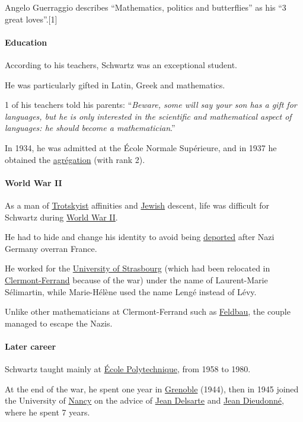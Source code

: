 \documentclass{article}
\begin{document}
%
Angelo Guerraggio describes ``Mathematics, politics and butterflies'' as his ``3 great loves''.[1]

\paragraph{Education}
According to his teachers, Schwartz was an exceptional student.

He was particularly gifted in Latin, Greek and mathematics.

1 of his teachers told his parents: ``\textit{Beware, some will say your son has a gift for languages, but he is only interested in the scientific and mathematical aspect of languages: he should become a mathematician}.''

%
In 1934, he was admitted at the École Normale Supérieure, and in 1937 he obtained the \href{https://en.wikipedia.org/wiki/Agr%C3%A9gation}{agrégation} (with rank 2).

\paragraph{World War II}
As a man of \href{https://en.wikipedia.org/wiki/Trotskyism}{Trotskyist} affinities and \href{https://en.wikipedia.org/wiki/Jew}{Jewish} descent, life was difficult for Schwartz during \href{https://en.wikipedia.org/wiki/World_War_II}{World War II}.

He had to hide and change his identity to avoid being \href{https://en.wikipedia.org/wiki/Deportation}{deported} after Nazi Germany overran France.

He worked for the \href{https://en.wikipedia.org/wiki/University_of_Strasbourg}{University of Strasbourg} (which had been relocated in \href{https://en.wikipedia.org/wiki/Clermont-Ferrand}{Clermont-Ferrand} because of the war) under the name of Laurent-Marie Sélimartin, while Marie-Hélène used the name Lengé instead of Lévy.

Unlike other mathematicians at Clermont-Ferrand such as \href{https://en.wikipedia.org/wiki/Jacques_Feldbau}{Feldbau}, the couple managed to escape the Nazis.

\paragraph{Later career}
Schwartz taught mainly at \href{https://en.wikipedia.org/wiki/%C3%89cole_Polytechnique}{École Polytechnique}, from 1958 to 1980.

At the end of the war, he spent one year in \href{https://en.wikipedia.org/wiki/Grenoble}{Grenoble} (1944), then in 1945 joined the University of \href{https://en.wikipedia.org/wiki/Nancy,_France}{Nancy} on the advice of \href{https://en.wikipedia.org/wiki/Jean_Delsarte}{Jean Delsarte} and \href{https://en.wikipedia.org/wiki/Jean_Dieudonn%C3%A9}{Jean Dieudonné}, where he spent 7 years.
\end{document}
